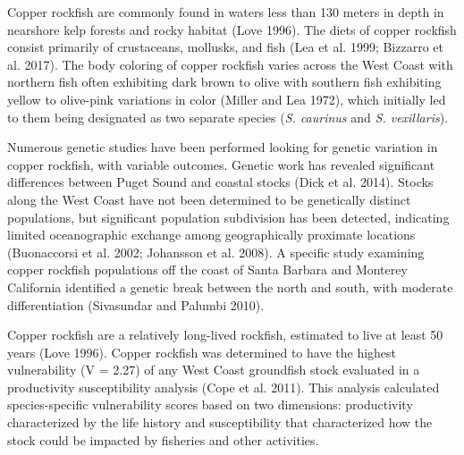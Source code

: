 \documentclass[11pt,
  english,
  a4paper,
]{article}
\begin{document}
\leavevmode\tagmcend\tagstructend\par


Copper rockfish are commonly found in waters less than 130 meters in depth in nearshore kelp forests and rocky habitat {(Love 1996)\leavevmode\tagmcend\tagstructend}. The diets of copper rockfish consist primarily of crustaceans, mollusks, and fish {(Lea et al. 1999; Bizzarro et al. 2017)\leavevmode\tagmcend\tagstructend}. The body coloring of copper rockfish varies across the West Coast with northern fish often exhibiting dark brown to olive with southern fish exhibiting yellow to olive-pink variations in color {(Miller and Lea 1972)\leavevmode\tagmcend\tagstructend}, which initially led to them being designated as two separate species (\emph{S. caurinus} and \emph{S. vexillaris}).

\leavevmode\tagmcend\tagstructend\par


Numerous genetic studies have been performed looking for genetic variation in copper rockfish, with variable outcomes. Genetic work has revealed significant differences between Puget Sound and coastal stocks {(Dick et al. 2014)\leavevmode\tagmcend\tagstructend}. Stocks along the West Coast have not been determined to be genetically distinct populations, but significant population subdivision has been detected, indicating limited oceanographic exchange among geographically proximate locations {(Buonaccorsi et al. 2002; Johansson et al. 2008)\leavevmode\tagmcend\tagstructend}. A specific study examining copper rockfish populations off the coast of Santa Barbara and Monterey California identified a genetic break between the north and south, with moderate differentiation {(Sivasundar and Palumbi 2010)\leavevmode\tagmcend\tagstructend}.

\leavevmode\tagmcend\tagstructend\par


Copper rockfish are a relatively long-lived rockfish, estimated to live at least 50 years {(Love 1996)\leavevmode\tagmcend\tagstructend}. Copper rockfish was determined to have the highest vulnerability (V = 2.27) of any West Coast groundfish stock evaluated in a productivity susceptibility analysis {(Cope et al. 2011)\leavevmode\tagmcend\tagstructend}. This analysis calculated species-specific vulnerability scores based on two dimensions: productivity characterized by the life history and susceptibility that characterized how the stock could be impacted by fisheries and other activities.
\end{document}
